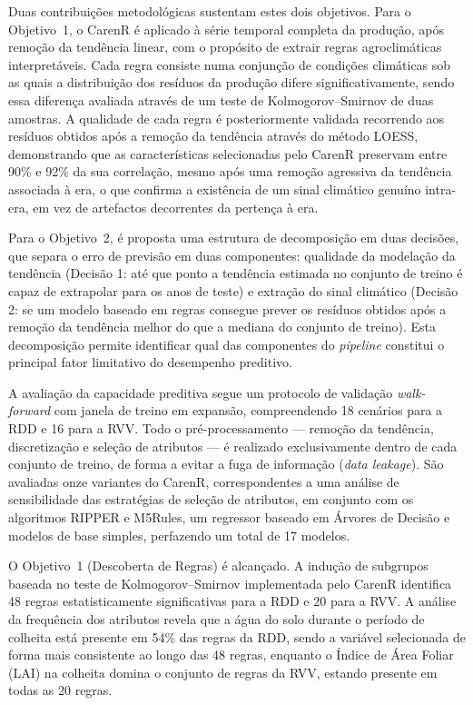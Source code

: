 Duas contribuições metodológicas sustentam estes dois objetivos. Para o Objetivo~1, o CarenR é aplicado à série temporal completa da produção, após remoção da tendência linear, com o propósito de extrair regras agroclimáticas interpretáveis. Cada regra consiste numa conjunção de condições climáticas sob as quais a distribuição dos resíduos da produção difere significativamente, sendo essa diferença avaliada através de um teste de Kolmogorov--Smirnov de duas amostras. A qualidade de cada regra é posteriormente validada recorrendo aos resíduos obtidos após a remoção da tendência através do método LOESS, demonstrando que as características selecionadas pelo CarenR preservam entre 90\% e 92\% da sua correlação, mesmo após uma remoção agressiva da tendência associada à era, o que confirma a existência de um sinal climático genuíno intra-era, em vez de artefactos decorrentes da pertença à era.

Para o Objetivo~2, é proposta uma estrutura de decomposição em duas decisões, que separa o erro de previsão em duas componentes: qualidade da modelação da tendência (Decisão 1: até que ponto a tendência estimada no conjunto de treino é capaz de extrapolar para os anos de teste) e extração do sinal climático (Decisão 2: se um modelo baseado em regras consegue prever os resíduos obtidos após a remoção da tendência melhor do que a mediana do conjunto de treino). Esta decomposição permite identificar qual das componentes do \textit{pipeline} constitui o principal fator limitativo do desempenho preditivo.

A avaliação da capacidade preditiva segue um protocolo de validação \textit{walk-forward} com janela de treino em expansão, compreendendo 18 cenários para a RDD e 16 para a RVV. Todo o pré-processamento --- remoção da tendência, discretização e seleção de atributos --- é realizado exclusivamente dentro de cada conjunto de treino, de forma a evitar a fuga de informação (\textit{data leakage}). São avaliadas onze variantes do CarenR, correspondentes a uma análise de sensibilidade das estratégias de seleção de atributos, em conjunto com os algoritmos RIPPER e M5Rules, um regressor baseado em Árvores de Decisão e modelos de base simples, perfazendo um total de 17 modelos.

O Objetivo~1 (Descoberta de Regras) é alcançado. A indução de subgrupos baseada no teste de Kolmogorov--Smirnov implementada pelo CarenR identifica 48 regras estatisticamente significativas para a RDD e 20 para a RVV. A análise da frequência dos atributos revela que a água do solo durante o período de colheita está presente em 54\% das regras da RDD, sendo a variável selecionada de forma mais consistente ao longo das 48 regras, enquanto o Índice de Área Foliar (LAI) na colheita domina o conjunto de regras da RVV, estando presente em todas as 20 regras.


